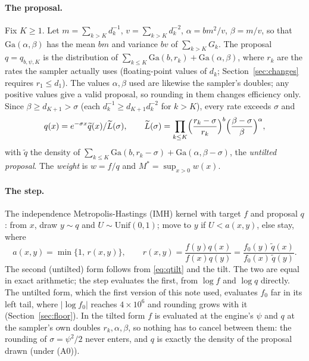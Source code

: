 \documentclass[11pt]{article}
\theoremstyle{definition}
\newcommand{\Ga}{\mathrm{Ga}}
\newcommand{\qt}{\widetilde q}
\newcommand{\fz}{f_0}
\begin{document}
\paragraph{The proposal.} Fix $K\ge1$. Let $m=\sum_{k>K}d_k^{-1}$, $v=\sum_{k>K}d_k^{-2}$, $\alpha=bm^2/v$,
$\beta=m/v$, so that $\Ga(\alpha,\beta)$ has the mean $bm$ and variance $bv$ of $\sum_{k>K}G_k$. The proposal
$q=q_{b,\psi,K}$ is the distribution of $\sum_{k\le K}\Ga(b,r_k)+\Ga(\alpha,\beta)$, where $r_k$ are the rates the
sampler actually uses (floating-point values of $d_k$; Section~\ref{sec:changes} requires $r_1\le d_1$). The
values $\alpha,\beta$ used are likewise the sampler's doubles; any positive values give a valid proposal, so
rounding in them changes efficiency only. Since $\beta\ge d_{K+1}>\sigma$ (each $d_k^{-1}\ge d_{K+1}d_k^{-2}$
for $k>K$), every rate exceeds $\sigma$ and
\begin{equation}\label{eq:qtilt}
  q(x)=e^{-\sigma x}\qt(x)/\widetilde L(\sigma),\qquad \widetilde L(\sigma)
  =\prod_{k\le K}\Bigl(\frac{r_k-\sigma}{r_k}\Bigr)^b\Bigl(\frac{\beta-\sigma}{\beta}\Bigr)^\alpha,
\end{equation}
with $\qt$ the density of $\sum_{k\le K}\Ga(b,r_k-\sigma)+\Ga(\alpha,\beta-\sigma)$, the \emph{untilted
proposal}. The \emph{weight} is $w=f/q$ and $M^*=\sup_{x>0}w(x)$.

\paragraph{The step.} The independence Metropolis-Hastings (IMH) kernel with target $f$ and proposal $q$:
from $x$, draw $y\sim q$ and $U\sim\mathrm{Unif}(0,1)$; move to $y$ if $U<a(x,y)$, else stay, where
\begin{equation}\label{eq:ratio}
  a(x,y)=\min\{1,\,r(x,y)\},\qquad
  r(x,y)=\frac{f(y)q(x)}{f(x)q(y)}=\frac{\fz(y)\,\qt(x)}{\fz(x)\,\qt(y)} .
\end{equation}
The second (untilted) form follows from \eqref{eq:qtilt} and the tilt. The two are equal in exact arithmetic;
the step evaluates the first, from $\log f$ and $\log q$ directly. The untilted form, which the first version of
this note used, evaluates $\fz$ far in its left tail, where $|\log\fz|$ reaches $4\times10^6$ and rounding grows with
it (Section~\ref{sec:floor}). In the tilted form $f$ is evaluated at the engine's $\psi$ and $q$ at the
sampler's own doubles $r_k,\alpha,\beta$, so nothing has to cancel between them: the rounding of
$\sigma=\psi^2/2$ never enters, and $q$ is exactly the density of the proposal drawn (under (A0)).
\end{document}
